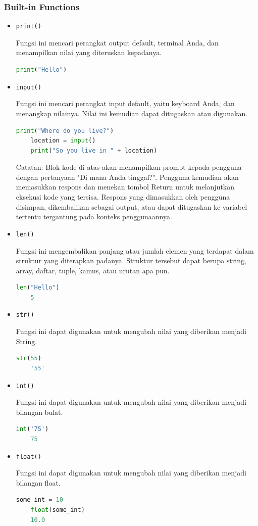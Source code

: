\documentclass{article}
\begin{document}
\subsubsection{Built-in Functions}
\begin{itemize}
    \item \verb|print()|

          Fungsi ini mencari perangkat output default, terminal Anda, dan menampilkan nilai yang diteruskan kepadanya.
          \begin{lstlisting}[language=Python, caption={}, captionpos=b]
    print("Hello")
    \end{lstlisting}
    \item \verb|input()|

          Fungsi ini mencari perangkat input default, yaitu keyboard Anda, dan menangkap nilainya. Nilai ini kemudian dapat ditugaskan atau digunakan.
          \begin{lstlisting}[language=Python, caption={}, captionpos=b]
    print("Where do you live?")
    location = input()
    print("So you live in " + location)
    \end{lstlisting}
          Catatan: Blok kode di atas akan menampilkan prompt kepada pengguna dengan pertanyaan "Di mana Anda tinggal?". Pengguna kemudian akan memasukkan respons dan menekan tombol Return untuk melanjutkan eksekusi kode yang tersisa. Respons yang dimasukkan oleh pengguna disimpan, dikembalikan sebagai output, atau dapat ditugaskan ke variabel tertentu tergantung pada konteks penggunaannya.
    \item \verb|len()|

          Fungsi ini mengembalikan panjang atau jumlah elemen yang terdapat dalam struktur yang diterapkan padanya. Struktur tersebut dapat berupa string, array, daftar, tuple, kamus, atau urutan apa pun.
          \begin{lstlisting}[language=Python, caption={}, captionpos=b]
    len("Hello")
    5
    \end{lstlisting}
    \item \verb|str()|

          Fungsi ini dapat digunakan untuk mengubah nilai yang diberikan menjadi String.
          \begin{lstlisting}[language=Python, caption={}, captionpos=b]
    str(55)
    '55'
    \end{lstlisting}
    \item \verb|int()|

          Fungsi ini dapat digunakan untuk mengubah nilai yang diberikan menjadi bilangan bulat.
          \begin{lstlisting}[language=Python, caption={}, captionpos=b]
    int('75')
    75
    \end{lstlisting}
    \item \verb|float()|

          Fungsi ini dapat digunakan untuk mengubah nilai yang diberikan menjadi bilangan float.
          \begin{lstlisting}[language=Python, caption={}, captionpos=b]
    some_int = 10
    float(some_int)
    10.0
    \end{lstlisting}
\end{itemize}
\end{document}
